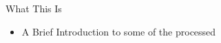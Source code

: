 \begin{frame}[t]{What This Is}
\begin{itemize}
	\item A Brief Introduction to some of the processed
\end{itemize}
\end{frame}
